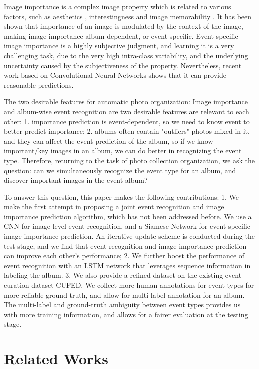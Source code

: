 \documentclass[runningheads]{llncs}
\begin{document}
Image importance is a complex image property which is related to various factors, such as aesthetics \cite{aesthe_14}, interestingness \cite{interesting} and image memorability \cite{Isola2011}. It has been shown \cite{CVPR} that importance of an image is modulated by the context of the image, making image importance album-dependent, or event-specific. Event-specific image importance is a highly subjective judgment, and learning it is a very challenging task, due to the very high intra-class variability, and the underlying uncertainty caused by the subjectiveness of the property. Nevertheless, recent work \cite{CVPR} based on Convolutional Neural Networks shows that it can provide reasonable predictions. 

The two desirable features for automatic photo organization: Image importance and album-wise event recognition are two desirable features are relevant to each other: 1. importance prediction is event-dependent, so we need to know event to better predict importance; 2. albums often contain "outliers" photos mixed in it, and they can affect the event prediction of the album, so if we know important/key images in an album, we can do better in recognizing the event type.  Therefore, returning to the task of photo collection organization, we ask the question: can we simultaneously recognize the event type for an album, and discover important images in the event album? 

To answer this question, this paper makes the following contributions: 1. We make the first attempt in proposing a joint event recognition and image importance prediction algorithm, which has not been addressed before. We use a CNN for image level event recognition, and a Siamese Network for event-specific image importance prediction. An iterative update scheme is conducted during the test stage, and we find that event recognition and image importance prediction can improve each other's performance; 2. We further boost the performance of event recognition with an LSTM network that leverages sequence information in labeling the album. 3. We also provide a refined dataset on the existing event curation dataset CUFED. We collect more human annotations for event types for more reliable ground-truth, and allow for multi-label annotation for an album. The multi-label and ground-truth ambiguity between event types provides us with more training information, and allows for a fairer evaluation at the testing stage.

\section{Related Works}
\end{document}
